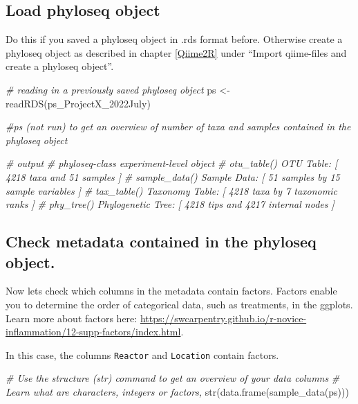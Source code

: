 \documentclass[
]{book}
\newenvironment{Shaded}{\begin{snugshade}}{\end{snugshade}}
\newcommand{\CommentTok}[1]{\textcolor[rgb]{0.56,0.35,0.01}{\textit{#1}}}
\newcommand{\FunctionTok}[1]{\textcolor[rgb]{0.00,0.00,0.00}{#1}}
\newcommand{\NormalTok}[1]{#1}
\newcommand{\OtherTok}[1]{\textcolor[rgb]{0.56,0.35,0.01}{#1}}
\newcommand{\StringTok}[1]{\textcolor[rgb]{0.31,0.60,0.02}{#1}}
\begin{document}
\hypertarget{load-phyloseq-object-1}{%
\subsection{Load phyloseq object}\label{load-phyloseq-object-1}}

Do this if you saved a phyloseq object in .rds format before. Otherwise create a phyloseq object as described in chapter \ref{Qiime2R} under ``Import qiime-files and create a phyloseq object''.

\begin{Shaded}
\begin{Highlighting}[]
\CommentTok{\# reading in a previously saved phyloseq object}
\NormalTok{ps }\OtherTok{\textless{}{-}} \FunctionTok{readRDS}\NormalTok{(}\StringTok{\textquotesingle{}ps\_ProjectX\_2022July\textquotesingle{}}\NormalTok{)}

\CommentTok{\#ps (not run) to get an overview of number of taxa and samples contained in the phyloseq object}

\CommentTok{\# output}
\CommentTok{\# phyloseq{-}class experiment{-}level object}
\CommentTok{\# otu\_table()   OTU Table:         [ 4218 taxa and 51 samples ]}
\CommentTok{\# sample\_data() Sample Data:       [ 51 samples by 15 sample variables ]}
\CommentTok{\# tax\_table()   Taxonomy Table:    [ 4218 taxa by 7 taxonomic ranks ]}
\CommentTok{\# phy\_tree()    Phylogenetic Tree: [ 4218 tips and 4217 internal nodes ]}
\end{Highlighting}
\end{Shaded}

\hypertarget{check-metadata-contained-in-the-phyloseq-object.}{%
\subsection{Check metadata contained in the phyloseq object.}\label{check-metadata-contained-in-the-phyloseq-object.}}

Now lets check which columns in the metadata contain factors. Factors enable you to determine the order of categorical data, such as treatments, in the ggplots. Learn more about factors here: \url{https://swcarpentry.github.io/r-novice-inflammation/12-supp-factors/index.html}.

In this case, the columns \texttt{Reactor} and \texttt{Location} contain factors.

\begin{Shaded}
\begin{Highlighting}[]
\CommentTok{\# Use the \textquotesingle{}structure\textquotesingle{} (str) command to get an overview of your data columns}
\CommentTok{\# Learn what are characters, integers or factors, }
\FunctionTok{str}\NormalTok{(}\FunctionTok{data.frame}\NormalTok{(}\FunctionTok{sample\_data}\NormalTok{(ps)))}
\end{Highlighting}
\end{Shaded}
\end{document}
